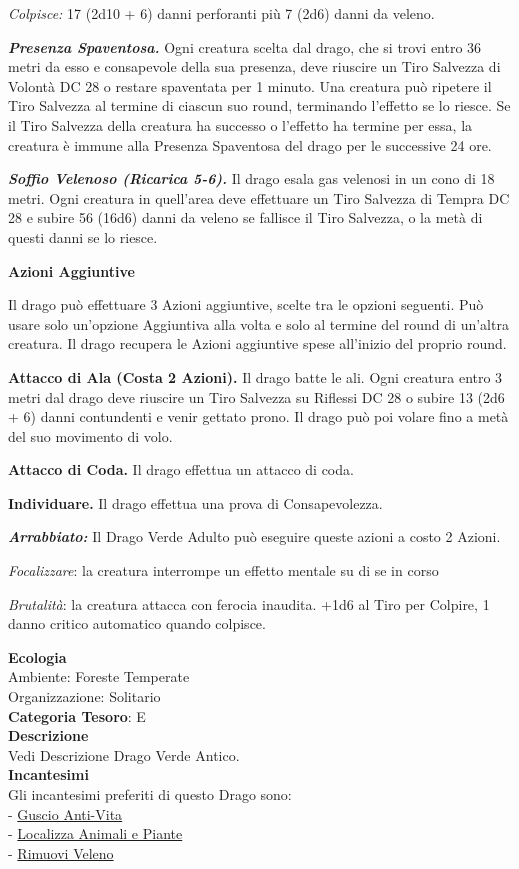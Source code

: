 \begin{multicols}{2}
{\emph{Colpisce:} 17 (2d10 + 6) danni perforanti più 7 (2d6) danni da veleno.

\emph{\textbf{Presenza Spaventosa.}} Ogni creatura scelta dal drago, che si trovi entro 36 metri da esso e consapevole della sua presenza, deve riuscire un Tiro Salvezza di Volontà DC 28 o restare spaventata per 1 minuto. Una creatura può ripetere il Tiro Salvezza al termine di ciascun suo round, terminando l'effetto se lo riesce. Se il Tiro Salvezza della creatura ha successo o l'effetto ha termine per essa, la creatura è immune alla Presenza Spaventosa del drago per le successive 24 ore.

\emph{\textbf{Soffio Velenoso (Ricarica 5-6).}} Il drago esala gas velenosi in un cono di 18 metri. Ogni creatura in quell'area deve effettuare un Tiro Salvezza di Tempra DC 28 e subire 56 (16d6) danni da veleno se fallisce il Tiro Salvezza, o la metà di questi danni se lo riesce.

\textbf{Azioni Aggiuntive}

Il drago può effettuare 3 Azioni aggiuntive, scelte tra le opzioni seguenti. Può usare solo un'opzione Aggiuntiva alla volta e solo al termine del round di un'altra creatura. Il drago recupera le Azioni aggiuntive spese all'inizio del proprio round.

\textbf{Attacco di Ala (Costa 2 Azioni).} Il drago batte le ali. Ogni creatura entro 3 metri dal drago deve riuscire un Tiro Salvezza su Riflessi DC 28 o subire 13 (2d6 + 6) danni contundenti e venir gettato prono. Il drago può poi volare fino a metà del suo movimento di volo.

\textbf{Attacco di Coda.} Il drago effettua un attacco di coda.

\textbf{Individuare.} Il drago effettua una prova di Consapevolezza.

\emph{\textbf{Arrabbiato:}} Il Drago Verde Adulto può eseguire queste azioni a costo 2 Azioni.

\emph{Focalizzare}: la creatura interrompe un effetto mentale su di se in corso

\emph{Brutalità}: la creatura attacca con ferocia inaudita. +1d6 al Tiro per Colpire, 1 danno critico automatico quando colpisce.

\textbf{Ecologia}\\
Ambiente: Foreste Temperate\\
Organizzazione: Solitario\\
\textbf{Categoria Tesoro}: E\\
\textbf{Descrizione}\\
Vedi Descrizione Drago Verde Antico.\\
\textbf{Incantesimi}\\
Gli incantesimi preferiti di questo Drago sono:\\
- \hyperlink{Guscio Anti-Vita}{Guscio Anti-Vita}\\
- \hyperlink{Localizza Animali e Piante}{Localizza Animali e Piante}\\
- \hyperlink{Rimuovi Veleno}{Rimuovi Veleno}

}
\end{multicols}
